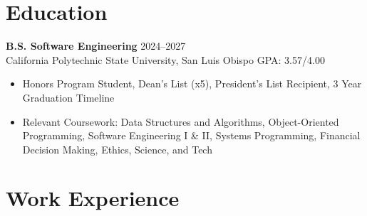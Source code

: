 \documentclass[a4paper,12pt]{article}
\makeatletter
\newenvironment{joblong}[2]
    {
    \begin{tabularx}{\linewidth}{@{}l X r@{}}
    \textbf{#1} & \hfill &  #2 \\[3.75pt]
    \end{tabularx}
    \begin{minipage}[t]{\linewidth}
    \begin{itemize}[nosep,after=\strut, leftmargin=1em, itemsep=3pt,label=\small$\bullet$]
    }
    {
    \end{itemize}
    \end{minipage}    
    }
\makeatother
\begin{document}
\section{Education}
\textbf{B.S. Software Engineering} \hfill 2024--2027 \\
California Polytechnic State University, San Luis Obispo \hfill GPA: 3.57/4.00 
\begin{itemize}[leftmargin=15pt, nosep, label=\small$\bullet$]
    \item Honors Program Student, Dean's List (x5), President's List Recipient, 3 Year Graduation Timeline
    \item Relevant Coursework: Data Structures and Algorithms, Object-Oriented Programming, Software Engineering I \& II, Systems Programming, Financial Decision Making, Ethics, Science, and Tech
\end{itemize}


\section{Work Experience}

\end{document}
